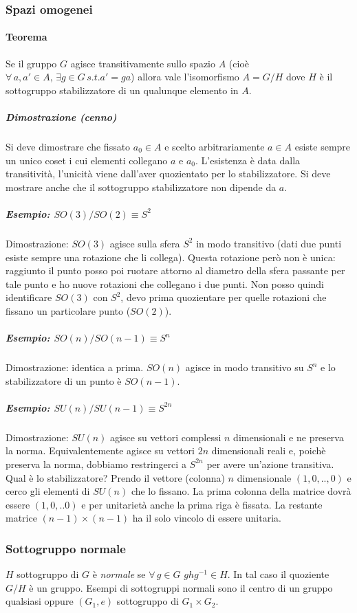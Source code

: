 \documentclass[12pt,oneside,notitlepage,abstracton,a4paper]{scrartcl}
\begin{document}
\subsubsection{Spazi omogenei}
\paragraph{Teorema} Se il gruppo $G$ agisce transitivamente sullo spazio $A$ (cioè $\forall\,a,a'\in A,\, \exists g\in G\,s.t.a' = ga$) allora vale l'isomorfismo $A=G/H$ dove $H$ è il sottogruppo stabilizzatore di un qualunque elemento in $A$.
\subparagraph{Dimostrazione (cenno)} Si deve dimostrare che fissato $a_0 \in A$ e scelto arbitrariamente $a\in A$ esiste sempre un unico coset i cui elementi collegano $a$ e $a_0$. L'esistenza è data dalla transitività, l'unicità viene dall'aver quozientato per lo stabilizzatore. Si deve mostrare anche che il sottogruppo stabilizzatore non dipende da $a$.

\subparagraph{Esempio: $SO(3)/SO(2) \equiv S^2$} Dimostrazione: $SO(3)$ agisce sulla sfera $S^2$ in modo transitivo (dati due punti esiste sempre una rotazione che li collega). Questa rotazione però non è unica: raggiunto il punto posso poi ruotare attorno al diametro della sfera passante per tale punto e ho nuove rotazioni che collegano i due punti. Non posso quindi identificare $SO(3)$ con $S^2$, devo prima quozientare per quelle rotazioni che fissano un particolare punto ($SO(2)$).

\subparagraph{Esempio: $SO(n)/SO(n-1) \equiv S^n$} Dimostrazione: identica a prima. $SO(n)$ agisce in modo transitivo su $S^n$ e lo stabilizzatore di un punto è $SO(n-1)$.

\subparagraph{Esempio: $SU(n)/SU(n-1) \equiv S^{2n}$} Dimostrazione: $SU(n)$ agisce su vettori complessi $n$ dimensionali e ne preserva la norma. Equivalentemente agisce su vettori $2n$ dimensionali reali e, poichè preserva la norma, dobbiamo restringerci a $S^{2n}$ per avere un'azione transitiva. Qual è lo stabilizzatore? Prendo il vettore (colonna) $n$ dimensionale $(1, 0, .., 0)$ e cerco gli elementi di $SU(n)$ che lo fissano. La prima colonna della matrice dovrà essere $(1, 0, .. 0)$ e per unitarietà anche la prima riga è fissata. La restante matrice $(n-1)\times(n-1)$ ha il solo vincolo di essere unitaria.

\subsubsection{Sottogruppo normale}
$H$ sottogruppo di $G$ è \emph{normale} se $\forall\,g\in G$ $ghg^{-1} \in H$. In tal caso il quoziente $G/H$ è un gruppo. Esempi di sottogruppi normali sono il centro di un gruppo qualsiasi oppure $(G_1, e)$ sottogruppo di $G_1 \times G_2$.
\end{document}
